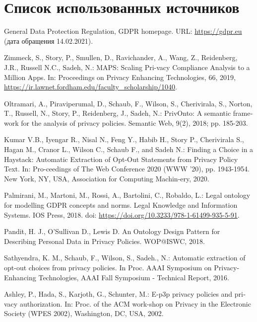 \documentclass[../main]{subfiles}
\begin{document}
\newpage
{}
\section*{Список использованных источников}

\begin{english}
\begin{biblenum}

     General Data Protection Regulation, GDPR homepage. URL: \url{https://gdpr.eu} (дата обращения 14.02.2021).
    
     Zimmeck, S., Story, P., Smullen, D., Ravichander, A., Wang, Z., Reidenberg, J.R., Russell N.C., Sadeh, N.: MAPS: Scaling Pri-vacy Compliance Analysis to a Million Apps. In: Proceedings on Privacy Enhancing Technologies, 66, 2019, \url{https://ir.lawnet.fordham.edu/faculty_scholarship/1040}.

     Oltramari, A., Piraviperumal, D., Schaub, F., Wilson, S., Cherivirala, S., Norton, T., Russell, N., Story, P., Reidenberg, J., Sadeh, N.: PrivOnto: A semantic framework for the analysis of privacy policies. Semantic Web, 9(2), 2018; pp. 185-203.

     Kumar V.B., Iyengar R., Nisal N., Feng Y., Habib H., Story P., Cherivirala S., Hagan M., Cranor L., Wilson C., Schaub F., and Sadeh N.: Finding a Choice in a Haystack: Automatic Extraction of Opt-Out Statements from Privacy Policy Text. In: Pro-ceedings of The Web Conference 2020 (WWW ’20), pp. 1943-1954. New York, NY, USA, Association for Computing Machin-ery, 2020. 

     Palmirani, M., Martoni, M., Rossi, A., Bartolini, C., Robaldo, L.: Legal ontology for modelling GDPR concepts and norms. Legal Knowledge and Information Systems. IOS Press, 2018. doi: \url{https://doi.org/10.3233/978-1-61499-935-5-91}.

     Pandit, H. J., O’Sullivan D., Lewis D. An Ontology Design Pattern for Describing Personal Data in Privacy Policies. WOP@ISWC, 2018.

     Sathyendra, K. M., Schaub, F., Wilson, S., Sadeh., N.: Automatic extraction of opt-out choices from privacy policies. In Proc. AAAI Symposium on Privacy-Enhancing Technologies, AAAI Fall Symposium - Technical Report, 2016.

     Ashley, P., Hada, S., Karjoth, G., Schunter, M.: E-p3p privacy policies and privacy authorization. In: Proc. of the ACM work-shop on Privacy in the Electronic Society (WPES 2002), Washington, DC, USA, 2002. 


\end{biblenum}
\end{english}
\end{document}
